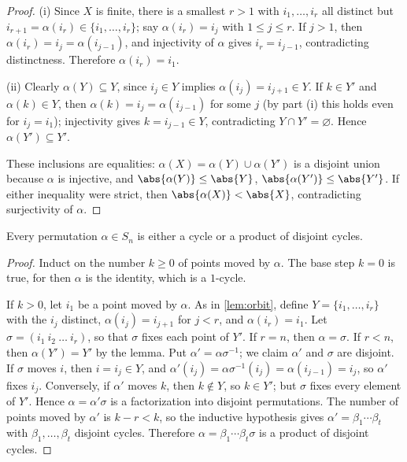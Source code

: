 \begin{proof}
	(i) Since \(X\) is finite, there is a smallest \(r > 1\) with \(i_1, \dots, i_r\) all
	distinct but \(i_{r+1} = \alpha(i_r) \in \{i_1, \dots, i_r\}\); say
	\(\alpha(i_r) = i_j\) with \(1 \leq j \leq r\). If \(j > 1\), then
	\(\alpha(i_r) = i_j = \alpha(i_{j-1})\), and injectivity of \(\alpha\) gives
	\(i_r = i_{j-1}\), contradicting distinctness. Therefore \(\alpha(i_r) = i_1\).

	(ii) Clearly \(\alpha(Y) \subseteq Y\), since \(i_j \in Y\) implies
	\(\alpha(i_j) = i_{j+1} \in Y\). If \(k \in Y'\) and \(\alpha(k) \in Y\), then
	\(\alpha(k) = i_j = \alpha(i_{j-1})\) for some \(j\) (by part (i) this holds even for
	\(i_j = i_1\)); injectivity gives \(k = i_{j-1} \in Y\), contradicting
	\(Y \cap Y' = \varnothing\). Hence \(\alpha(Y') \subseteq Y'\).

	These inclusions are equalities: \(\alpha(X) = \alpha(Y) \cup \alpha(Y')\) is a disjoint
	union because \(\alpha\) is injective, and \(\abs{\alpha(Y)} \leq \abs{Y}\),
	\(\abs{\alpha(Y')} \leq \abs{Y'}\). If either inequality were strict, then
	\(\abs{\alpha(X)} < \abs{X}\), contradicting surjectivity of \(\alpha\).
\end{proof}

\begin{proposition}\label{prop:disjoint-cycles}
	Every permutation \(\alpha \in S_n\) is either a cycle or a product of disjoint cycles.
\end{proposition}

\begin{proof}
	Induct on the number \(k \geq 0\) of points moved by \(\alpha\). The base step
	\(k = 0\) is true, for then \(\alpha\) is the identity, which is a \(1\)-cycle.

	If \(k > 0\), let \(i_1\) be a point moved by \(\alpha\). As in \autoref{lem:orbit},
	define \(Y = \{i_1, \dots, i_r\}\) with the \(i_j\) distinct, \(\alpha(i_j) = i_{j+1}\)
	for \(j < r\), and \(\alpha(i_r) = i_1\). Let \(\sigma = (i_1\ i_2\ \dots\ i_r)\), so
	that \(\sigma\) fixes each point of \(Y'\). If \(r = n\), then \(\alpha = \sigma\).
	If \(r < n\), then \(\alpha(Y') = Y'\) by the lemma. Put \(\alpha' = \alpha\sigma^{-1}\);
	we claim \(\alpha'\) and \(\sigma\) are disjoint. If \(\sigma\) moves \(i\), then
	\(i = i_j \in Y\), and
	\(\alpha'(i_j) = \alpha\sigma^{-1}(i_j) = \alpha(i_{j-1}) = i_j\), so \(\alpha'\) fixes
	\(i_j\). Conversely, if \(\alpha'\) moves \(k\), then \(k \notin Y\), so \(k \in Y'\);
	but \(\sigma\) fixes every element of \(Y'\). Hence \(\alpha = \alpha'\sigma\) is a
	factorization into disjoint permutations. The number of points moved by \(\alpha'\) is
	\(k - r < k\), so the inductive hypothesis gives \(\alpha' = \beta_1 \cdots \beta_t\)
	with \(\beta_1, \dots, \beta_t\) disjoint cycles. Therefore
	\(\alpha = \beta_1 \cdots \beta_t \sigma\) is a product of disjoint cycles.
\end{proof}

